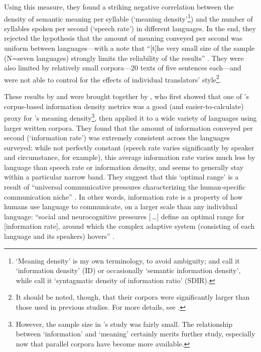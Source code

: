 \documentclass[12pt,twoside,leqno]{article} %
\begin{document}
Using this measure, they found a striking negative correlation between the density of semantic meaning per syllable (`meaning density'\footnote{`Meaning density' is my own terminology, to avoid ambiguity; \citet{pellegrino} and \citet{oh} call it `information density' (ID) or occasionally `semantic information density', while \citet{coupé} call it `syntagmatic density of information ratio' (SDIR).}) and the number of syllables spoken per second (`speech rate') in different languages. In the end, they rejected the hypothesis that the amount of meaning conveyed per second was uniform between languages---with a note that ``[t]he very small size of the sample (N=seven languages) strongly limits the reliability of the results'' \citep[550]{pellegrino}. They were also limited by relatively small corpora---20 texts of five sentences each---and were not able to control for the effects of individual translators' style\footnote{It should be noted, though, that their corpora were significantly larger than those used in previous studies. For more details, see \citereset\citet[545]{pellegrino}.}.

These results by \citet{oh} and \citet{pellegrino} were brought together by \citet{coupé}, who first showed that one of \citeauthor{oh}'s corpus-based information density metrics was a good (and easier-to-calculate) proxy for \citeauthor{pellegrino}'s meaning density\footnote{However, the sample size in \citeauthor{pellegrino}'s study was fairly small. The relationship between `information' and `meaning' certainly merits further study, especially now that parallel corpora have become more available.}, then applied it to a wide variety of languages using larger written corpora. They found that the amount of information conveyed per second (`information rate') was extremely consistent across the languages surveyed: while not perfectly constant (speech rate varies significantly by speaker and circumstance, for example), this average information rate varies much less by language than speech rate or information density, and seems to generally stay within a particular narrow band. They suggest that this `optimal range' is a result of ``universal communicative pressures characterizing the human-specific communication niche'' \citep[6]{coupé}. In other words, information rate is a property of how humans use language to communicate, on a larger scale than any individual language: ``social and neurocognitive pressures [\,\ldots] define an optimal range for [information rate], around which the complex adaptive system (consisting of each language and its speakers) hovers'' \citep[6]{coupé}.
\end{document}
